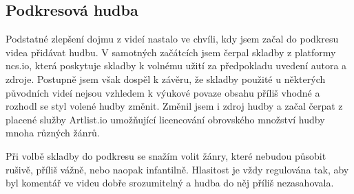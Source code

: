 \subsection{Podkresová hudba}
Podstatné zlepšení dojmu z videí nastalo ve chvíli, kdy jsem začal do podkresu videa přidávat hudbu.
V samotných začátcích jsem čerpal skladby z platformy ncs.io, která poskytuje skladby k volnému užití za předpokladu uvedení autora a zdroje.
Postupně jsem však dospěl k závěru, že skladby použité u některých původních videí nejsou vzhledem k výukové povaze obsahu příliš vhodné a rozhodl se styl volené hudby změnit. 
Změnil jsem i zdroj hudby a začal čerpat z placené služby Artlist.io umožňující licencování obrovského množství hudby mnoha různých žánrů.

Při volbě skladby do podkresu se snažím volit žánry, které nebudou působit rušivě, příliš vážně, nebo naopak infantilně.
Hlasitost je vždy regulována tak, aby byl komentář ve videu dobře srozumitelný a hudba do něj příliš nezasahovala.

